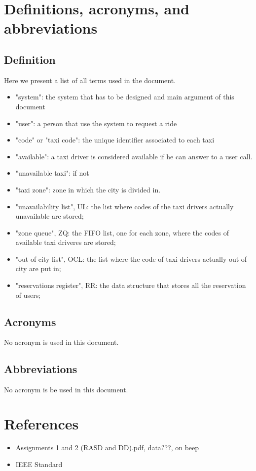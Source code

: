 \section{Definitions, acronyms, and abbreviations}
\subsection{Definition}
Here we present a list of all terms used in the document.
\begin{itemize}
\item "system": the system that has to be designed and main argument of this document
\item "user": a person that use the system to request a ride
\item "code" or "taxi code": the unique identifier associated to each taxi
\item "available": a taxi driver is considered available if he can answer to a user call.
\item "unavailable taxi": if not
\item "taxi zone": zone in which the city is divided in.
\item "unavailability list", UL: the list where codes of the taxi drivers actually unavailable are stored;
\item "zone queue", ZQ: the FIFO list, one for each zone, where the codes of available taxi driveres are stored;
\item "out of city list", OCL: the list where the code of taxi drivers actually out of city are put in;
\item "reservations register", RR: the data structure that stores all the reservation of users;
\end{itemize}


\subsection{Acronyms}
No acronym is used in this document.


\subsection{Abbreviations}
No acronym is be used in this document.


\section{References}
\begin{itemize}
\item Assignments 1 and 2 (RASD and DD).pdf, data???, on beep
\item IEEE Standard
\end{itemize}


